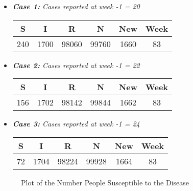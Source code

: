 \documentclass[12pt]{report}
\begin{document}
\begin{itemize}
    \item \emph{\textbf{Case 1: } Cases reported at week -1 = 20}
    
    \begin{tabular}{|c|c|c|c|c|c|}
        \hline
        S&I&R&N&New&Week\\
        \hline
        240&	1700&	98060&	99760&	1660&	83\\

        \hline
    \end{tabular}
    
    \item \emph{\textbf{Case 2: } Cases reported at week -1 = 22}
    
    \begin{tabular}{|c|c|c|c|c|c|}
        \hline
        S&I&R&N&New&Week\\
        \hline
        156&	1702&	98142&	99844&	1662&	83\\


        \hline
    \end{tabular}
    
    \item \emph{\textbf{Case 3: } Cases reported at week -1 = 24}
    
    \begin{tabular}{|c|c|c|c|c|c|}
        \hline
        S&I&R&N&New&Week\\
        \hline
        72&	1704&	98224&	99928&	1664&	83\\


        \hline
    \end{tabular}
    
\end{itemize}


\begin{figure}[p]
\begin{center}
    \label{susceptible}
    \caption{Plot of the Number People Susceptible to the Disease}
\end{center}
\end{figure}
\end{document}
